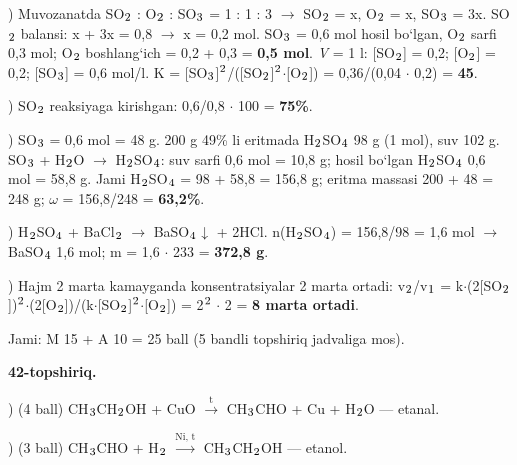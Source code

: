 \documentclass[11pt,a4paper]{article}
\renewcommand{\textsubscript}[1]{\ensuremath{_{\text{\fontsize{8}{8}\selectfont #1}}}}
\renewcommand{\textsuperscript}[1]{\ensuremath{^{\text{\fontsize{8}{8}\selectfont #1}}}}
\begin{document}
) Muvozanatda SO\textsubscript{2} : O\textsubscript{2} : SO\textsubscript{3} = 1 : 1 : 3 $\to$ SO\textsubscript{2} = x, O\textsubscript{2} = x, SO\textsubscript{3} = 3x. SO\textsubscript{2} balansi: x + 3x = 0,8 $\to$ x = 0,2 mol. SO\textsubscript{3} = 0,6 mol hosil bo`lgan, O\textsubscript{2} sarfi 0,3 mol; O\textsubscript{2} boshlang`ich = 0,2 + 0,3 = \textbf{0,5 mol}. \textit{V} = 1 l: [SO\textsubscript{2}] = 0,2; [O\textsubscript{2}] = 0,2; [SO\textsubscript{3}] = 0,6 mol/l. K = [SO\textsubscript{3}]\textsuperscript{2}/([SO\textsubscript{2}]\textsuperscript{2}$\cdot$[O\textsubscript{2}]) = 0,36/(0,04 $\cdot$ 0,2) = \textbf{45}.\par
{}) SO\textsubscript{2} reaksiyaga kirishgan: 0,6/0,8 $\cdot$ 100 = \textbf{75\%}.\par
{}) SO\textsubscript{3} = 0,6 mol = 48 g. 200 g 49\% li eritmada H\textsubscript{2}SO\textsubscript{4} 98 g (1 mol), suv 102 g. SO\textsubscript{3} + H\textsubscript{2}O $\to$ H\textsubscript{2}SO\textsubscript{4}: suv sarfi 0,6 mol = 10,8 g; hosil bo`lgan H\textsubscript{2}SO\textsubscript{4} 0,6 mol = 58,8 g. Jami H\textsubscript{2}SO\textsubscript{4} = 98 + 58,8 = 156,8 g; eritma massasi 200 + 48 = 248 g; $\omega$ = 156,8/248 = \textbf{63,2\%}.\par
{}) H\textsubscript{2}SO\textsubscript{4} + BaCl\textsubscript{2} $\to$ BaSO\textsubscript{4}$\downarrow$ + 2HCl. n(H\textsubscript{2}SO\textsubscript{4}) = 156,8/98 = 1,6 mol $\to$ BaSO\textsubscript{4} 1,6 mol; m = 1,6 $\cdot$ 233 = \textbf{372,8 g}.\par
{}) Hajm 2 marta kamayganda konsentratsiyalar 2 marta ortadi: v\textsubscript{2}/v\textsubscript{1} = k$\cdot$(2[SO\textsubscript{2}])\textsuperscript{2}$\cdot$(2[O\textsubscript{2}])/(k$\cdot$[SO\textsubscript{2}]\textsuperscript{2}$\cdot$[O\textsubscript{2}]) = 2\textsuperscript{2} $\cdot$ 2 = \textbf{8 marta ortadi}.\par
\noindent Jami: M 15 + A 10 = 25 ball (5 bandli topshiriq jadvaliga mos).\par
\noindent\textbf{42-topshiriq.}\par
{}) (4 ball) CH\textsubscript{3}CH\textsubscript{2}OH + CuO $\xrightarrow{\text{t}}$ CH\textsubscript{3}CHO + Cu + H\textsubscript{2}O --- etanal.\par
{}) (3 ball) CH\textsubscript{3}CHO + H\textsubscript{2} $\xrightarrow{\text{Ni, t}}$ CH\textsubscript{3}CH\textsubscript{2}OH --- etanol.\par
\end{document}
